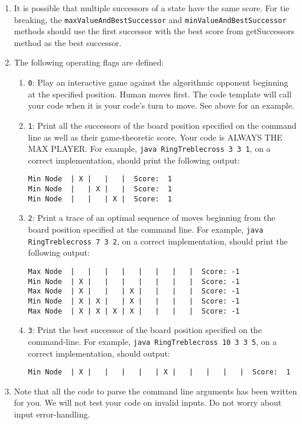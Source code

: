 \documentclass[10pt,a4paper]{article}
\begin{document}
\begin{enumerate}
\item It is possible that multiple successors of a state have the same score. For tie breaking, the \texttt{maxValueAndBestSuccessor} and \texttt{minValueAndBestSuccessor} methods should use the first successor with the best score from
getSuccessors method as the best successor. 

\item The following operating flags are defined:
\begin{enumerate}
  \item \texttt{0}: Play an interactive game against the algorithmic opponent beginning
    at the specified position.  Human moves first.
  The code template will call your code when it is your code's turn to move.
  See above for an example.
  
  \item \texttt{1}: Print all the successors of the board position specified on
    the command line as well as their game-theoretic score. 
    Your code is ALWAYS THE MAX PLAYER.
    For example,
    \texttt{java RingTreblecross 3 3 1}, on a correct implementation, should print
    the following output:
\begin{verbatim}
Min Node  | X |   |   |  Score:  1
Min Node  |   | X |   |  Score:  1
Min Node  |   |   | X |  Score:  1
\end{verbatim}
  \item \texttt{2}: Print a trace of an optimal sequence of moves beginning from
    the board position specified at the command line. For example, \texttt{java
      RingTreblecross 7 3 2}, on a correct implementation, should print the
    following output:
\begin{verbatim}
Max Node  |   |   |   |   |   |   |   |  Score: -1
Min Node  | X |   |   |   |   |   |   |  Score: -1
Max Node  | X |   |   | X |   |   |   |  Score: -1
Min Node  | X | X |   | X |   |   |   |  Score: -1
Max Node  | X | X | X | X |   |   |   |  Score: -1
\end{verbatim}
    \item \texttt{3}: Print the best successor of the board position specified
      on the command-line. For example, \texttt{java RingTreblecross 10 3 3 5}, on a
      correct implementation, should output:
\begin{verbatim}
Min Node  | X |   |   |   |   | X |   |   |   |   |  Score:  1
\end{verbatim}
\end{enumerate}

\item Note that all the code to parse the command line arguments has been
  written for you. We will not test your code on invalid inputs. Do not worry about
  input error-handling.


\end{enumerate}
\end{document}
